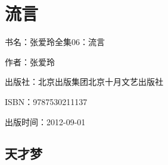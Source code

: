 






\section{流言}

\par 书名：张爱玲全集06：流言
\par 作者：张爱玲
\par 出版社：北京出版集团北京十月文艺出版社
\par ISBN：9787530211137
\par 出版时间：2012-09-01






\subsection{天才梦}

